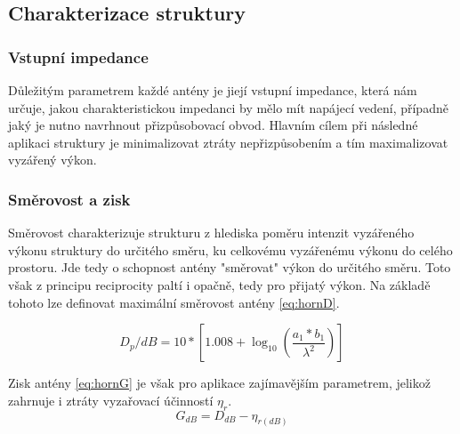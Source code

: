 \subsection{Charakterizace struktury}

\subsubsection{Vstupní impedance}
Důležitým parametrem každé antény je jiejí vstupní impedance, která nám určuje, jakou charakteristickou impedanci by mělo mít napájecí vedení, případně jaký je nutno navrhnout přizpůsobovací obvod. Hlavním cílem při následné aplikaci struktury je minimalizovat ztráty nepřizpůsobením a tím maximalizovat vyzářený výkon.

\subsubsection{Směrovost a zisk}
Směrovost charakterizuje strukturu z hlediska poměru intenzit vyzářeného výkonu struktury do určitého směru, ku celkovému vyzářenému výkonu do celého prostoru. Jde tedy o schopnost antény "směrovat" výkon do určitého směru. Toto však z principu reciprocity paltí i opačně, tedy pro přijatý výkon. Na základě tohoto lze definovat maximální směrovost antény \ref{eq:hornD}.

\begin{equation}
D_p/dB = 10*[1.008+\log_{10}({\frac{a_1 * b_1}{\lambda^2}})]
\label{eq:hornD}
\end{equation}

\renewcommand{\figurename}{Obrázek}
Zisk antény \ref{eq:hornG} je však pro aplikace zajímavějším parametrem, jelikož zahrnuje i ztráty vyzařovací účinností $\eta_r$.
\begin{equation}
G_{dB} = D_{dB} - \eta_{r(dB)}
\label{eq:hornG}
\end{equation}

